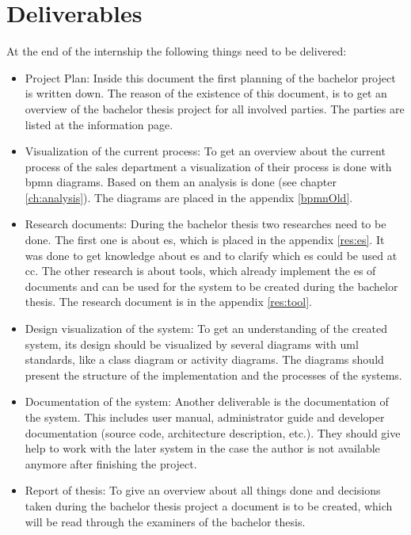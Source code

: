 \section{Deliverables}
At the end of the internship the following things need to be delivered:
\begin{itemize}
	\item Project Plan: Inside this document the first planning of the bachelor project is written down. The reason of the existence of this document, is to get an overview of the bachelor thesis project for all involved parties. The parties are listed at the information page.
	\item Visualization of the current process: To get an overview about the current process of the sales department a visualization of their process is done with \gls{bpmn} diagrams. Based on them an analysis is done (see chapter \ref{ch:analysis}). The diagrams are placed in the appendix \ref{bpmnOld}.
	\item Research documents: During the bachelor thesis two researches need to be done. The first one is about \gls{es}, which is placed in the appendix \ref{res:es}. It was done to get knowledge about \gls{es} and to clarify which \gls{es} could be used at \gls{cc}. The other research is about tools, which already implement the \gls{es} of documents and can be used for the system to be created during the bachelor thesis. The research document is in the appendix \ref{res:tool}.
	\item Design visualization of the system: To get an understanding of the created system, its design should be visualized by several diagrams with \gls{uml} standards, like a class diagram or activity diagrams. The diagrams should present the structure of the implementation and the processes of the systems.
	\item Documentation of the system: Another deliverable is the documentation of the system. This includes user manual, administrator guide and developer documentation (source code, architecture description, etc.). They should give help to work with the later system in the case the author is not available anymore after finishing the project.
	\item Report of thesis: To give an overview about all things done and decisions taken during the bachelor thesis project a document is to be created, which will be read through the examiners of the bachelor thesis.
\end{itemize}

